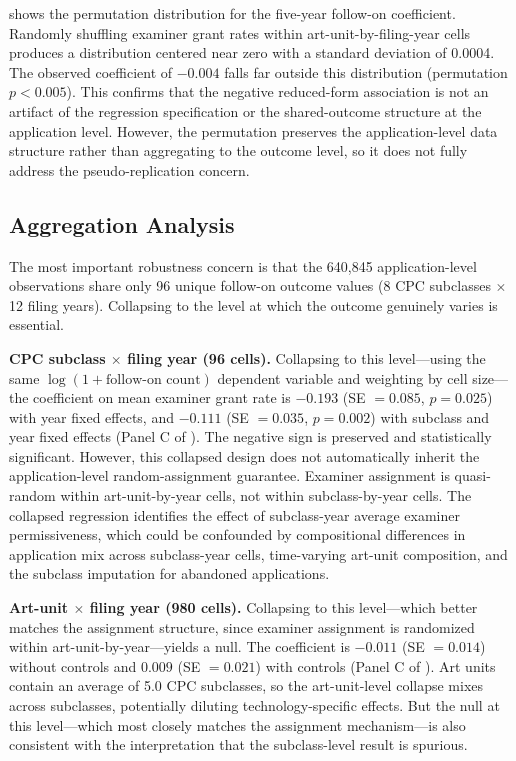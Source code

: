 \documentclass[12pt]{article}
\begin{document}
 shows the permutation distribution for the five-year follow-on coefficient. Randomly shuffling examiner grant rates within art-unit-by-filing-year cells produces a distribution centered near zero with a standard deviation of 0.0004. The observed coefficient of $-0.004$ falls far outside this distribution (permutation $p < 0.005$). This confirms that the negative reduced-form association is not an artifact of the regression specification or the shared-outcome structure at the application level. However, the permutation preserves the application-level data structure rather than aggregating to the outcome level, so it does not fully address the pseudo-replication concern.

\subsection{Aggregation Analysis}
\label{sec:aggregation}

The most important robustness concern is that the 640,845 application-level observations share only 96 unique follow-on outcome values (8 CPC subclasses $\times$ 12 filing years). Collapsing to the level at which the outcome genuinely varies is essential.

\textbf{CPC subclass $\times$ filing year (96 cells).} Collapsing to this level---using the same $\log(1 + \text{follow-on count})$ dependent variable and weighting by cell size---the coefficient on mean examiner grant rate is $-0.193$ (SE $= 0.085$, $p = 0.025$) with year fixed effects, and $-0.111$ (SE $= 0.035$, $p = 0.002$) with subclass and year fixed effects (Panel C of ). The negative sign is preserved and statistically significant. However, this collapsed design does not automatically inherit the application-level random-assignment guarantee. Examiner assignment is quasi-random within art-unit-by-year cells, not within subclass-by-year cells. The collapsed regression identifies the effect of subclass-year average examiner permissiveness, which could be confounded by compositional differences in application mix across subclass-year cells, time-varying art-unit composition, and the subclass imputation for abandoned applications.

\textbf{Art-unit $\times$ filing year (980 cells).} Collapsing to this level---which better matches the assignment structure, since examiner assignment is randomized within art-unit-by-year---yields a null. The coefficient is $-0.011$ (SE $= 0.014$) without controls and $0.009$ (SE $= 0.021$) with controls (Panel C of ). Art units contain an average of 5.0 CPC subclasses, so the art-unit-level collapse mixes across subclasses, potentially diluting technology-specific effects. But the null at this level---which most closely matches the assignment mechanism---is also consistent with the interpretation that the subclass-level result is spurious.
\end{document}
